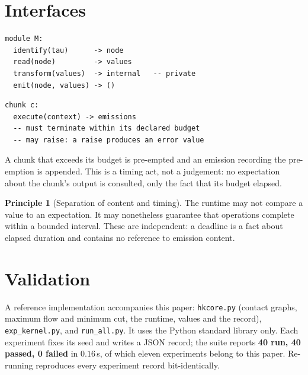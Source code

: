 \documentclass[11pt,twocolumn,a4paper]{article}
\theoremstyle{definition}
\newtheorem{principle}[theorem]{Principle}
\theoremstyle{remark}
\begin{document}
\section{Interfaces}
\label{sec:interfaces}

\begin{lstlisting}[caption={The complete module interface.},label={lst:module}]
module M:
  identify(tau)      -> node
  read(node)         -> values
  transform(values)  -> internal   -- private
  emit(node, values) -> ()
\end{lstlisting}

\begin{lstlisting}[caption={The complete chunk contract.},label={lst:chunk}]
chunk c:
  execute(context) -> emissions
  -- must terminate within its declared budget
  -- may raise: a raise produces an error value
\end{lstlisting}

A chunk that exceeds its budget is pre-empted and an emission recording the
pre-emption is appended. This is a timing act, not a judgement: no expectation
about the chunk's output is consulted, only the fact that its budget elapsed.

\begin{principle}[Separation of content and timing]
\label{prin:separation}
The runtime may not compare a value to an expectation. It may nonetheless
guarantee that operations complete within a bounded interval. These are
independent: a deadline is a fact about elapsed duration and contains no
reference to emission content.
\end{principle}

\section{Validation}
\label{sec:validation}

A reference implementation accompanies this paper: \texttt{hkcore.py} (contact
graphs, maximum flow and minimum cut, the runtime, values and the record),
\texttt{exp\_kernel.py}, and \texttt{run\_all.py}. It uses the Python standard
library only. Each experiment fixes its seed and writes a JSON record; the suite
reports \textbf{40 run, 40 passed, 0 failed} in $0.16$\,s, of which eleven
experiments belong to this paper. Re-running reproduces every experiment record
bit-identically.
\end{document}
